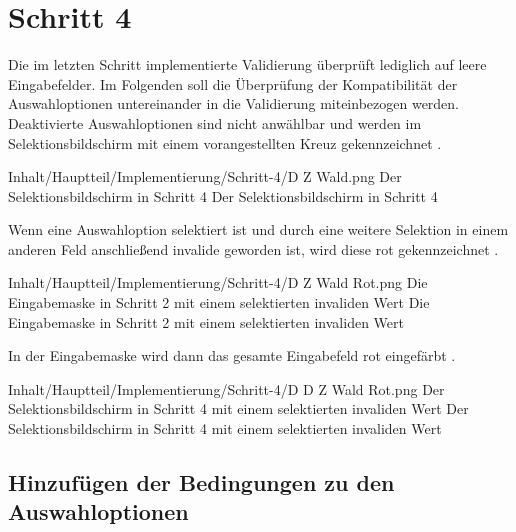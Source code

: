 \chapter{Schritt 4}
\label{chap:Schritt-4}

Die im letzten Schritt implementierte Validierung überprüft lediglich auf leere Eingabefelder.
Im Folgenden soll die Überprüfung der Kompatibilität der Auswahloptionen untereinander in die Validierung miteinbezogen werden.
Deaktivierte Auswahloptionen sind nicht anwählbar und werden im Selektionsbildschirm mit einem vorangestellten Kreuz gekennzeichnet \Abb{\ref{fig:Schritt4EingabemaskeDZWald}}.

\begin{alexfigure}{Inhalt/Hauptteil/Implementierung/Schritt-4/D Z Wald.png}
  {Der Selektionsbildschirm in Schritt 4}
  {Der Selektionsbildschirm in Schritt 4}

  \label{fig:Schritt4EingabemaskeDZWald}

\end{alexfigure}

Wenn eine Auswahloption selektiert ist und durch eine weitere Selektion in einem anderen Feld anschließend invalide geworden ist,
wird diese rot gekennzeichnet \Abb{\ref{fig:Schritt4EingabemaskeDZWaldRot}}.

\begin{alexfigure}{Inhalt/Hauptteil/Implementierung/Schritt-4/D Z Wald Rot.png}
  {Die Eingabemaske in Schritt 2 mit einem selektierten invaliden Wert}
  {Die Eingabemaske in Schritt 2 mit einem selektierten invaliden Wert}

  \label{fig:Schritt4EingabemaskeDZWaldRot}

\end{alexfigure}

In der Eingabemaske wird dann das gesamte Eingabefeld rot eingefärbt \Abb{\ref{fig:Schritt4EingabemaskeDDZWaldRot}}.

\begin{alexfigure}{Inhalt/Hauptteil/Implementierung/Schritt-4/D D Z Wald Rot.png}
  {Der Selektionsbildschirm in Schritt 4 mit einem selektierten invaliden Wert}
  {Der Selektionsbildschirm in Schritt 4 mit einem selektierten invaliden Wert}

  \label{fig:Schritt4EingabemaskeDDZWaldRot}

\end{alexfigure}

\section{Hinzufügen der Bedingungen zu den Auswahloptionen}

